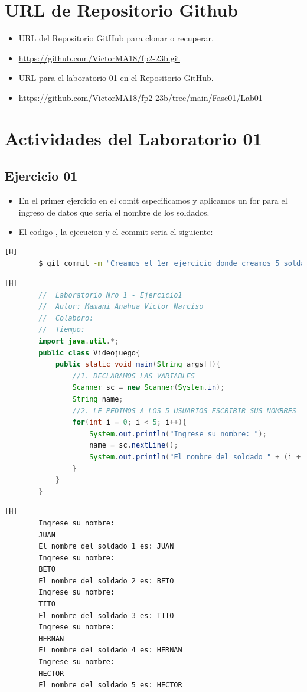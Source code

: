 \documentclass{article}
\begin{document}
	\section{URL de Repositorio Github}
	\begin{itemize}
		\item URL del Repositorio GitHub para clonar o recuperar.
		\item \url{https://github.com/VictorMA18/fp2-23b.git}
		\item URL para el laboratorio 01 en el Repositorio GitHub.
		\item \url{https://github.com/VictorMA18/fp2-23b/tree/main/Fase01/Lab01}
	\end{itemize}
	
	\section{Actividades del Laboratorio 01}
	
	\subsection{Ejercicio 01}
	\begin{itemize}	
		\item En el primer ejercicio en el comit especificamos y aplicamos un for para el ingreso de datos que seria el nombre de los soldados.
		\item El codigo , la ejecucion y el commit seria el siguiente:
	\end{itemize}	
	\begin{lstlisting}[language=bash,caption={Commit}][H]
		$ git commit -m "Creamos el 1er ejercicio donde creamos 5 soldados y imprimimos sus datos"
	\end{lstlisting}	
	\begin{lstlisting}[language=java,caption={Las lineas de codigos del Ejercicio01 serian}][H]
		//  Laboratorio Nro 1 - Ejercicio1
		//  Autor: Mamani Anahua Victor Narciso
		//  Colaboro:
		//  Tiempo:
		import java.util.*;
		public class Videojuego{
			public static void main(String args[]){
				//1. DECLARAMOS LAS VARIABLES
				Scanner sc = new Scanner(System.in);
				String name;
				//2. LE PEDIMOS A LOS 5 USUARIOS ESCRIBIR SUS NOMBRES
				for(int i = 0; i < 5; i++){
					System.out.println("Ingrese su nombre: ");
					name = sc.nextLine();
					System.out.println("El nombre del soldado " + (i + 1) + " es: " + name);
				}
			}
		}
	\end{lstlisting}
	\begin{lstlisting}[language=bash,caption={La ejecucion dada:}][H]
		Ingrese su nombre: 
		JUAN
		El nombre del soldado 1 es: JUAN
		Ingrese su nombre: 
		BETO
		El nombre del soldado 2 es: BETO
		Ingrese su nombre: 
		TITO
		El nombre del soldado 3 es: TITO
		Ingrese su nombre: 
		HERNAN
		El nombre del soldado 4 es: HERNAN
		Ingrese su nombre: 
		HECTOR
		El nombre del soldado 5 es: HECTOR
	\end{lstlisting}
\end{document}
